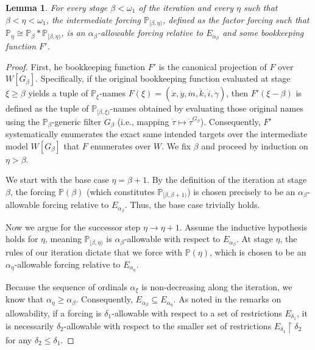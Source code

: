 \documentclass[a4paper,11pt]{article}
\newtheorem{lemma}[theorem]{Lemma}
\begin{document}
\begin{lemma}
For every stage $\beta < \omega_1$ of the iteration and every $\eta$ such that $\beta < \eta < \omega_1$, the intermediate forcing $\mathbb{P}_{[\beta,\eta)}$, defined as the factor forcing such that $\mathbb{P}_{\eta} \cong \mathbb{P}_{\beta} \ast \mathbb{P}_{[\beta,\eta)}$, is an $\alpha_{\beta}$-allowable forcing relative to $E_{\alpha_{\beta}}$ and some bookkeeping function $F'$.
\end{lemma}

\begin{proof}
First, he bookkeeping function $F'$ is the canonical projection of $F$ over $W[G_{\beta}]$. Specifically, if the original bookkeeping function evaluated at stage $\xi \ge \beta$ yields a tuple of $\mathbb{P}_{\xi}$-names $F(\xi) = (\dot{x}, \dot{y}, \dot{m}, \dot{k}, \dot{i}, \dot{\gamma})$, then $F'(\xi - \beta)$ is defined as the tuple of $\mathbb{P}_{[\beta, \xi)}$-names obtained by evaluating those original names using the $\mathbb{P}_{\beta}$-generic filter $G_{\beta}$ (i.e., mapping $\dot{\tau} \mapsto \dot{\tau}^{G_{\beta}}$). Consequently, $F'$ systematically enumerates the exact same intended targets over the intermediate model $W[G_{\beta}]$ that $F$ enumerates over $W$.
We fix $\beta$ and proceed by induction on $\eta > \beta$.

We start with the base case $\eta = \beta + 1$. 
By the definition of the iteration at stage $\beta$, the forcing $\mathbb{P}(\beta)$ (which constitutes $\mathbb{P}_{[\beta, \beta+1)}$) is chosen precisely to be an $\alpha_{\beta}$-allowable forcing relative to $E_{\alpha_{\beta}}$. Thus, the base case trivially holds.

Now we argue for the successor step $\eta \to \eta + 1$.
Assume the inductive hypothesis holds for $\eta$, meaning $\mathbb{P}_{[\beta,\eta)}$ is $\alpha_{\beta}$-allowable with respect to $E_{\alpha_{\beta}}$. At stage $\eta$, the rules of our iteration dictate that we force with $\mathbb{P}(\eta)$, which is chosen to be an $\alpha_{\eta}$-allowable forcing relative to $E_{\alpha_{\eta}}$. 

Because the sequence of ordinals $\alpha_{\xi}$ is non-decreasing along the iteration, we know that $\alpha_{\eta} \ge \alpha_{\beta}$. Consequently, $E_{\alpha_{\beta}} \subseteq E_{\alpha_{\eta}}$. As noted in the remarks on allowability, if a forcing is $\delta_1$-allowable with respect to a set of restrictions $E_{\delta_1}$, it is necessarily $\delta_2$-allowable with respect to the smaller set of restrictions $E_{\delta_1} \restriction \delta_2$ for any $\delta_2 \le \delta_1$. 


\end{proof}
\end{document}
